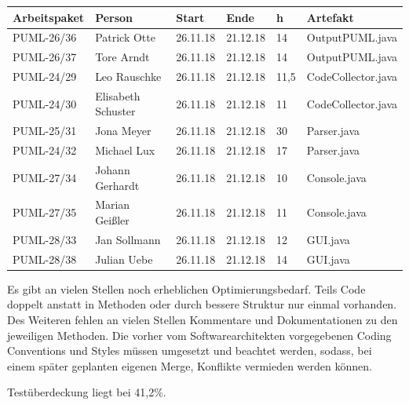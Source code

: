 \begin{longtable}{|p{4cm}|l|l|l|l|l|}
        \hline
        Arbeitspaket & Person & Start & Ende & h & Artefakt\\
        \hline
        PUML-26/36 & Patrick Otte & 26.11.18 & 21.12.18 & 14 & OutputPUML.java\\ \hline
        PUML-26/37 & Tore Arndt & 26.11.18 & 21.12.18 & 14 & OutputPUML.java\\ \hline
        PUML-24/29 & Leo Rauschke & 26.11.18 & 21.12.18 & 11,5 & CodeCollector.java\\ \hline  
        PUML-24/30 & Elisabeth Schuster & 26.11.18 & 21.12.18 & 11 & CodeCollector.java\\ \hline  
        PUML-25/31 & Jona Meyer & 26.11.18 & 21.12.18 & 30 & Parser.java\\ \hline  
        PUML-24/32 & Michael Lux & 26.11.18 & 21.12.18 & 17 & Parser.java\\ \hline  
        PUML-27/34 & Johann Gerhardt & 26.11.18 & 21.12.18 & 10 & Console.java\\ \hline
        PUML-27/35 & Marian Geißler & 26.11.18 & 21.12.18 & 11 & Console.java\\ \hline
        PUML-28/33 & Jan Sollmann & 26.11.18 & 21.12.18 & 12 & GUI.java\\ \hline
        PUML-28/38 & Julian Uebe & 26.11.18 & 21.12.18 & 14 & GUI.java\\ \hline
\end{longtable}     
\nsecend

Es gibt an vielen Stellen noch erheblichen Optimierungsbedarf. Teils Code doppelt anstatt in Methoden oder durch bessere Struktur nur einmal vorhanden. Des Weiteren fehlen an vielen Stellen Kommentare und Dokumentationen zu den jeweiligen Methoden. Die vorher vom Softwarearchitekten vorgegebenen Coding Conventions und Styles müssen umgesetzt und beachtet werden, sodass, bei einem später geplanten eigenen Merge, Konflikte vermieden werden können.
\nsecend

Testüberdeckung liegt bei 41,2\%.
\nsecend

